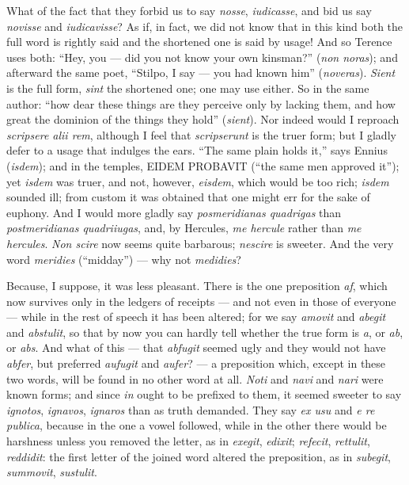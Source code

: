  What of the fact that they forbid us to say \textit{nosse}, \textit{iudicasse}, and bid us say \textit{novisse} and \textit{iudicavisse}? As if, in fact, we did not know that in this kind both the full word is rightly said and the shortened one is said by usage! And so Terence uses both: ``Hey, you — did you not know your own kinsman?'' (\textit{non noras}); and afterward the same poet, ``Stilpo, I say — you had known him'' (\textit{noveras}). \textit{Sient} is the full form, \textit{sint} the shortened one; one may use either. So in the same author: ``how dear these things are they perceive only by lacking them, and how great the dominion of the things they hold'' (\textit{sient}). Nor indeed would I reproach \textit{scripsere alii rem}, although I feel that \textit{scripserunt} is the truer form; but I gladly defer to a usage that indulges the ears. ``The same plain holds it,'' says Ennius (\textit{isdem}); and in the temples, EIDEM PROBAVIT (``the same men approved it''); yet \textit{isdem} was truer, and not, however, \textit{eisdem}, which would be too rich; \textit{isdem} sounded ill; from custom it was obtained that one might err for the sake of euphony. And I would more gladly say \textit{posmeridianas quadrigas} than \textit{postmeridianas quadriiugas}, and, by Hercules, \textit{me hercule} rather than \textit{me hercules}. \textit{Non scire} now seems quite barbarous; \textit{nescire} is sweeter. And the very word \textit{meridies} (``midday'') — why not \textit{medidies}?

 Because, I suppose, it was less pleasant. There is the one preposition \textit{af}, which now survives only in the ledgers of receipts — and not even in those of everyone — while in the rest of speech it has been altered; for we say \textit{amovit} and \textit{abegit} and \textit{abstulit}, so that by now you can hardly tell whether the true form is \textit{a}, or \textit{ab}, or \textit{abs}. And what of this — that \textit{abfugit} seemed ugly and they would not have \textit{abfer}, but preferred \textit{aufugit} and \textit{aufer}? — a preposition which, except in these two words, will be found in no other word at all. \textit{Noti} and \textit{navi} and \textit{nari} were known forms; and since \textit{in} ought to be prefixed to them, it seemed sweeter to say \textit{ignotos}, \textit{ignavos}, \textit{ignaros} than as truth demanded. They say \textit{ex usu} and \textit{e re publica}, because in the one a vowel followed, while in the other there would be harshness unless you removed the letter, as in \textit{exegit}, \textit{edixit}; \textit{refecit}, \textit{rettulit}, \textit{reddidit}: the first letter of the joined word altered the preposition, as in \textit{subegit}, \textit{summovit}, \textit{sustulit}.

